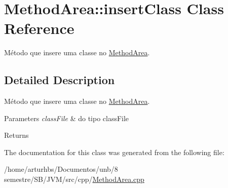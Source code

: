 \hypertarget{classMethodArea_1_1insertClass}{}\section{Method\+Area\+:\+:insert\+Class Class Reference}
\label{classMethodArea_1_1insertClass}


Método que insere uma classe no \hyperlink{classMethodArea}{Method\+Area}.  




\subsection{Detailed Description}
Método que insere uma classe no \hyperlink{classMethodArea}{Method\+Area}. 


\begin{DoxyParams}{Parameters}
{\em class\+File} & do tipo class\+File \\
\hline
\end{DoxyParams}
\begin{DoxyReturn}{Returns}

\end{DoxyReturn}


The documentation for this class was generated from the following file\+:\begin{DoxyCompactItemize}
\item 
/home/arturhbs/\+Documentos/unb/8 semestre/\+S\+B/\+J\+V\+M/src/cpp/\hyperlink{MethodArea_8cpp}{Method\+Area.\+cpp}\end{DoxyCompactItemize}
